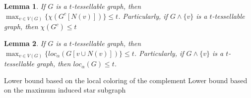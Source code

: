 \documentclass[9pt]{entcs} \usepackage{entcsmacro}
\newtheorem{lema}{Lemma}[section]
\begin{document}
\begin{lema}
\label{lemachilocal}
If $G$ is a $t$-tessellable graph, then $\max_{v \in V(G)}\{\chi(G^c[N(v)])\} \leq t$. Particularly, if $G \land \{v\}$ is a $t$-tessellable graph, then $\chi(G^c) \leq t$
\end{lema}

\begin{lema}
\label{lemalocalocal}
If $G$ is a $t$-tessellable graph, then $\max_{v \in V(G)}\{loc_\alpha(G[v \cup N(v)])\} \leq t$. Particularly, if $G \land \{v\}$ is a $t$-tessellable graph, then $loc_\alpha(G) \leq t$.
\end{lema}










Lower bound based on the local coloring of the complement
Lower bound based on the maximum induced star subgraph
\end{document}
